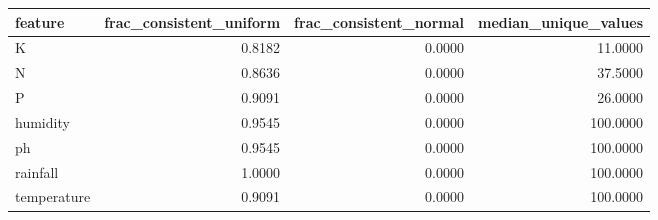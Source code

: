 \begin{tabular}{lrrr}
\toprule
feature & frac_consistent_uniform & frac_consistent_normal & median_unique_values \\
\midrule
K & 0.8182 & 0.0000 & 11.0000 \\
N & 0.8636 & 0.0000 & 37.5000 \\
P & 0.9091 & 0.0000 & 26.0000 \\
humidity & 0.9545 & 0.0000 & 100.0000 \\
ph & 0.9545 & 0.0000 & 100.0000 \\
rainfall & 1.0000 & 0.0000 & 100.0000 \\
temperature & 0.9091 & 0.0000 & 100.0000 \\
\bottomrule
\end{tabular}
